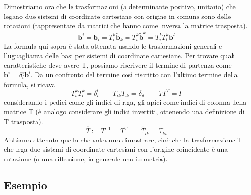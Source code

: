  Dimostriamo ora che le trasformazioni (a determinante positivo, unitario) che legano due sistemi di 
  coordinate cartesiane con origine in comune sono delle rotazioni (rappresentate da matrici che 
  hanno come inversa la matrice trasposta).
 \begin{equation}
  \bm{b}^i = \bm{b}_i = T^k_i \tilde{\bm{b}}_k = T^k_i \tilde{\bm{b}}^k = T^k_i T^k_l \bm{b}^l
 \end{equation}
 La formula qui sopra è stata ottenuta usando le trasformazioni generali e l'uguaglianza delle basi
  per sistemi di coordinate cartesiane. Per trovare quali caratteristiche deve avere T, possiamo
  riscrivere il termine di partenza come $\bm{b}^i = \delta_l^i \bm{b}^l$. Da un confronto del termine
  così riscritto con l'ultimo termine della formula, si ricava
  \begin{equation}
   T^k_i T^k_l  = \delta_i^l \qquad T_{ik} T_{lk}  = \delta_{il} \qquad T T^T = I
  \end{equation}
  considerando i pedici come gli indici di riga, gli apici come indici di colonna della matrice T 
  (è analogo considerare gli indici invertiti, ottenendo una definizione di T trasposta).
  \begin{equation}
   \hat{T} := T^{-1} = T^T \qquad \hat{T}_{ik} = T_{ki}
  \end{equation}
  Abbiamo ottenuto quello che volevamo dimostrare, cioè che la trasformazione T che lega due sistemi 
  di coordinate cartesiani con l'origine coincidente è una rotazione (o una riflessione, in generale una isometria).
 
 \newpage
 \subsection{Esempio}
 
